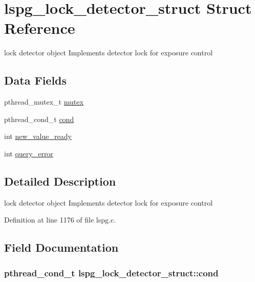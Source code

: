 \hypertarget{structlspg__lock__detector__struct}{\section{lspg\-\_\-lock\-\_\-detector\-\_\-struct Struct Reference}
\label{structlspg__lock__detector__struct}
}


lock detector object Implements detector lock for exposure control  


\subsection*{Data Fields}
\begin{DoxyCompactItemize}
\item 
pthread\-\_\-mutex\-\_\-t \hyperlink{structlspg__lock__detector__struct_ab5ab5534b376a8fbafdd0b54cec4483c}{mutex}
\item 
pthread\-\_\-cond\-\_\-t \hyperlink{structlspg__lock__detector__struct_adc90c859665dccc8717219e824cba0b8}{cond}
\item 
int \hyperlink{structlspg__lock__detector__struct_a62373414b815fe178edd8522b3bd4d78}{new\-\_\-value\-\_\-ready}
\item 
int \hyperlink{structlspg__lock__detector__struct_afdad2787564475cac316153d117c3748}{query\-\_\-error}
\end{DoxyCompactItemize}


\subsection{Detailed Description}
lock detector object Implements detector lock for exposure control 

Definition at line 1176 of file lspg.\-c.



\subsection{Field Documentation}
\hypertarget{structlspg__lock__detector__struct_adc90c859665dccc8717219e824cba0b8}{
\subsubsection[{cond}]{\setlength{\rightskip}{0pt plus 5cm}pthread\-\_\-cond\-\_\-t lspg\-\_\-lock\-\_\-detector\-\_\-struct\-::cond}}\label{structlspg__lock__detector__struct_adc90c859665dccc8717219e824cba0b8}


